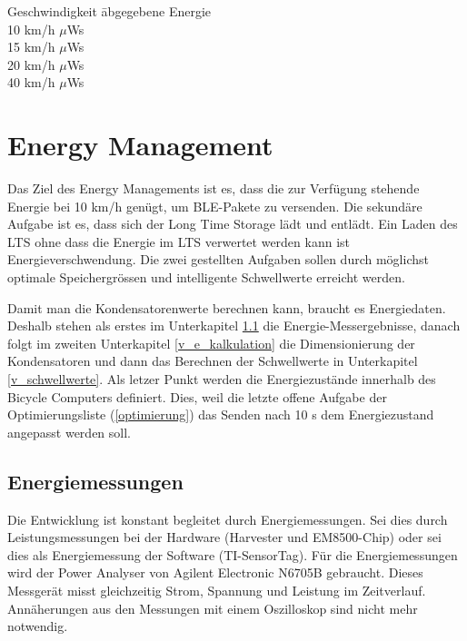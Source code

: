 \label{tab:em_out_zsm}
\begin{tabbing}
    Geschwindigkeit   	\quad\= abgegebene Energie    \\[0.8ex]
    10 km/h		         $\mu$Ws\\
	15 km/h		         $\mu$Ws\\
	20 km/h		         $\mu$Ws\\
	40 km/h		         $\mu$Ws\\
\end{tabbing}

\section{Energy Management}

Das Ziel des Energy Managements ist es, dass die zur Verfügung stehende Energie bei 10 km/h genügt, um BLE-Pakete zu versenden. Die sekundäre Aufgabe ist es, dass sich der Long Time Storage lädt und entlädt. Ein Laden des LTS ohne dass die Energie im LTS verwertet werden kann ist Energieverschwendung. Die zwei gestellten Aufgaben sollen durch möglichst optimale Speichergrössen und intelligente Schwellwerte erreicht werden.

Damit man die Kondensatorenwerte berechnen kann, braucht es Energiedaten. Deshalb stehen als erstes im Unterkapitel \ref{v_messungen_sensortag} die Energie-Messergebnisse, danach folgt im zweiten Unterkapitel \ref{v_e_kalkulation} die Dimensionierung der Kondensatoren und dann das Berechnen der Schwellwerte in Unterkapitel \ref{v_schwellwerte}. Als letzer Punkt werden die Energiezustände innerhalb des Bicycle Computers definiert. Dies, weil die letzte offene Aufgabe der Optimierungsliste (\ref{optimierung}) das Senden nach 10 s dem Energiezustand angepasst werden soll.


\subsection{Energiemessungen}
\label{v_messungen_sensortag}


Die Entwicklung ist konstant begleitet durch Energiemessungen. Sei dies durch Leistungsmessungen bei der Hardware (Harvester und EM8500-Chip) oder sei dies als Energiemessung der Software (TI-SensorTag). Für die Energiemessungen wird der Power Analyser von Agilent Electronic N6705B gebraucht. Dieses Messgerät misst gleichzeitig Strom, Spannung und Leistung im Zeitverlauf. Annäherungen aus den Messungen mit einem Oszilloskop sind nicht mehr notwendig.

